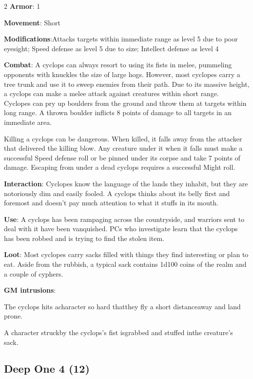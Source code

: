 \begin{multicols}{2}
\textbf{Armor}: 1 

\textbf{Movement}: Short 

\textbf{Modifications}:Attacks targets within immediate range as level 5 due to poor eyesight; Speed defense as level 5 due to size; Intellect defense as level 4 

\textbf{Combat}: A cyclops can always resort to using its fists in melee, pummeling opponents with knuckles the size of large hogs. However, most cyclopes carry a tree trunk and use it to sweep enemies from their path. Due to its massive height, a cyclops can make a melee attack against creatures within short range. 
Cyclopes can pry up boulders from the ground and throw them at targets within long range. A thrown boulder inflicts 8 points of damage to all targets in an immediate area. 

Killing a cyclops can be dangerous. When killed, it falls away from the attacker that delivered the killing blow. Any creature under it when it falls must make a successful Speed defense roll or be pinned under its corpse and take 7 points of damage. Escaping from under a dead cyclops requires a successful Might roll. 

\textbf{Interaction}: Cyclopes know the language of the lands they inhabit, but they are notoriously dim and easily fooled. A cyclops thinks about its belly first and foremost and doesn’t pay much attention to what it stuffs in its mouth. 

\textbf{Use}: A cyclops has been rampaging across the countryside, and warriors sent to deal with it have been vanquished. PCs who investigate learn that the cyclops has been robbed and is trying to find the stolen item. 

\textbf{Loot}: Most cyclopes carry sacks filled with things they find interesting or plan to eat. Aside from the rubbish, a typical sack contains 1d100 coins of the realm and a couple of cyphers.

\textbf{GM intrusions}: 

The cyclops hits acharacter so hard thatthey fly a short distanceaway and land prone.

A character struckby the cyclops’s fist isgrabbed and stuffed inthe creature’s sack.

\subsection{Deep One	4 (12)}


\end{multicols}
